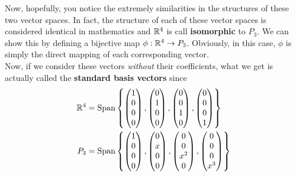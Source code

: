 Now, hopefully, you notice the extremely similarities in the structures of these two vector spaces. In fact, the structure of each of these vector spaces is considered identical in mathematics and $\mathbb R^4$ is call \textbf{isomorphic} to $P_3$. We can show this by defining a bijective map $\phi: \mathbb R^{4} \to P_3$. Obviously, in this case, $\phi$ is simply the direct mapping of each corresponding vector. \\ Now, if we consider these vectors \textit{without} their coefficients, what we get is actually called the \textbf{standard basis vectors} since 
\begin{align*}
    \mathbb R^4 &= \text{Span}\left\{\begin{pmatrix}
        1 \\ 0 \\ 0 \\ 0
    \end{pmatrix}, 
    \begin{pmatrix}
        0 \\ 1 \\ 0 \\ 0
    \end{pmatrix}, 
    \begin{pmatrix}
        0 \\ 0 \\ 1 \\ 0
    \end{pmatrix}, 
    \begin{pmatrix}
        0 \\ 0 \\ 0 \\ 1
    \end{pmatrix} \right\} \\
    P_3 &= \text{Span}\left\{\begin{pmatrix}
        1 \\ 0 \\ 0 \\ 0
    \end{pmatrix}, 
    \begin{pmatrix}
        0 \\ x \\ 0 \\ 0
    \end{pmatrix}, 
    \begin{pmatrix}
        0 \\ 0 \\ x^2 \\ 0
    \end{pmatrix}, 
    \begin{pmatrix}
        0 \\ 0 \\ 0 \\ x^3
    \end{pmatrix} \right\}
\end{align*}

